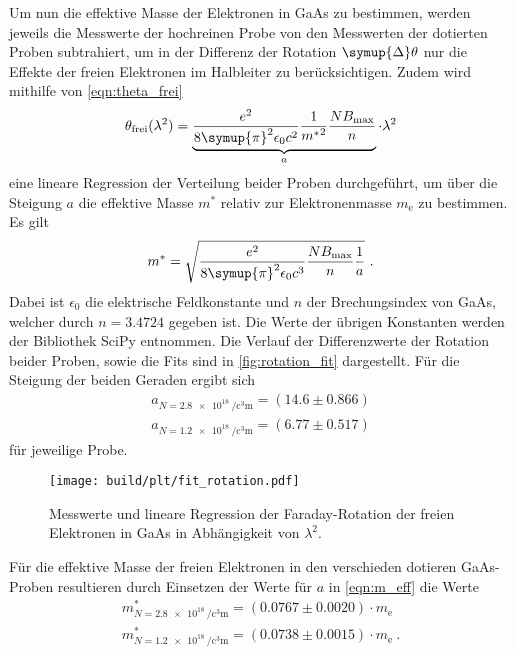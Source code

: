 Um nun die effektive Masse der Elektronen in GaAs zu bestimmen,
werden jeweils die Messwerte der hochreinen Probe von den Messwerten der dotierten Proben subtrahiert,
um in der Differenz der Rotation $\symup{\Delta}\theta$ nur die Effekte der freien Elektronen im Halbleiter zu berücksichtigen.
Zudem wird mithilfe von \autoref{eqn:theta_frei}
\begin{equation*}
    \theta_\text{frei} (\lambda^2) = \underbrace{\frac{e^2}{8 \symup{\pi}^2 \epsilon_0 c^2} \frac{1}{{m^{*}}^2} \frac{N B_\text{max}}{n}}_{a} \cdot \lambda^2
\end{equation*}
eine lineare Regression der Verteilung beider Proben durchgeführt,
um über die Steigung $a$ die effektive Masse $m^*$ relativ zur Elektronenmasse $m_\text{e}$ zu bestimmen.
Es gilt
\begin{equation}
    m^* = \sqrt{\frac{e^2}{8 \symup{\pi}^2 \epsilon_0 c^3} \frac{N B_\text{max}}{n} \frac{1}{a}} \ .
    \label{eqn:m_eff}
\end{equation}
Dabei ist $\epsilon_0$ die elektrische Feldkonstante und $n$ der Brechungsindex von GaAs,
welcher durch $n = 3.4724$ \cite{brechungsindex} gegeben ist.
Die Werte der übrigen Konstanten werden der Bibliothek SciPy \cite{SciPy} entnommen.
Die Verlauf der Differenzwerte der Rotation beider Proben,
sowie die Fits sind in \autoref{fig:rotation_fit} dargestellt.
Für die Steigung der beiden Geraden ergibt sich
\begin{gather*}
    a_{N=\SI[per-mode=reciprocal]{2.8e18}{\per\cubic\centi\meter}} = (14.6 \pm 0.866) \\
    a_{N=\SI[per-mode=reciprocal]{1.2e18}{\per\cubic\centi\meter}} = (6.77 \pm 0.517)
\end{gather*}
für jeweilige Probe.
\begin{figure}
    \centering
    \texttt{[image: build/plt/fit\_rotation.pdf]}
    \caption{Messwerte und lineare Regression der Faraday-Rotation der freien Elektronen in GaAs in Abhängigkeit von $\lambda^2$.}
    \label{fig:rotation_fit}
\end{figure}
Für die effektive Masse der freien Elektronen in den verschieden dotieren GaAs-Proben resultieren durch Einsetzen der Werte für $a$ in \autoref{eqn:m_eff} die Werte
\begin{gather*}
    m^*_{N=\SI[per-mode=reciprocal]{2.8e18}{\per\cubic\centi\meter}} = (0.0767 \pm 0.0020) \cdot m_\text{e} \\
    m^*_{N=\SI[per-mode=reciprocal]{1.2e18}{\per\cubic\centi\meter}} = (0.0738 \pm 0.0015) \cdot m_\text{e} \ .
\end{gather*}
